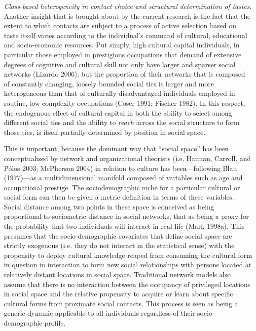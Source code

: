 \documentclass[
]{article}
\begin{document}
\emph{Class-based heterogeneity in contact choice and structural determination of tastes}. Another insight that is brought about by the current research is the fact that the extent to which contacts are subject to a process of active selection based on taste itself varies according to the individual's command of cultural, educational and socio-economic resources. Put simply, high cultural capital individuals, in particular those employed in prestigious occupations that demand of extensive degrees of cognitive and cultural skill not only have larger and sparser social networks (Lizardo 2006), but the proportion of their networks that is composed of constantly changing, loosely bounded social ties is larger and more heterogeneous than that of culturally disadvantaged individuals employed in routine, low-complexity occupations (Coser 1991; Fischer 1982). In this respect, the endogenous effect of cultural capital in both the ability to select among different social ties and the ability to \emph{reach} across the social structure to form those ties, is itself partially determined by position in social space.

This is important, because the dominant way that ``social space'' has been conceptualized by network and organizational theorists (i.e. Hannan, Carroll, and Pólos 2003; McPherson 2004) in relation to culture has been---following Blau (1977)---as a multidimensional manifold composed of variables such as age and occupational prestige. The sociodemographic niche for a particular cultural or social form can then be given a metric definition in terms of these variables. Social distance among two points in these space is conceived as being proportional to sociometric distance in social networks, that as being a proxy for the probability that two individuals will interact in real life (Mark 1998a). This presumes that the socio-demographic covariates that define social space are strictly exogenous (i.e. they do not interact in the statistical sense) with the propensity to deploy cultural knowledge reaped from consuming the cultural form in question in interaction to form new social relationships with persons located at relatively distant locations in social space. Traditional network models also assume that there is no interaction between the occupancy of privileged locations in social space and the relative propensity to acquire or learn about specific cultural forms from proximate social contacts. This process is seen as being a generic dynamic applicable to all individuals regardless of their socio-demographic profile.
\end{document}
